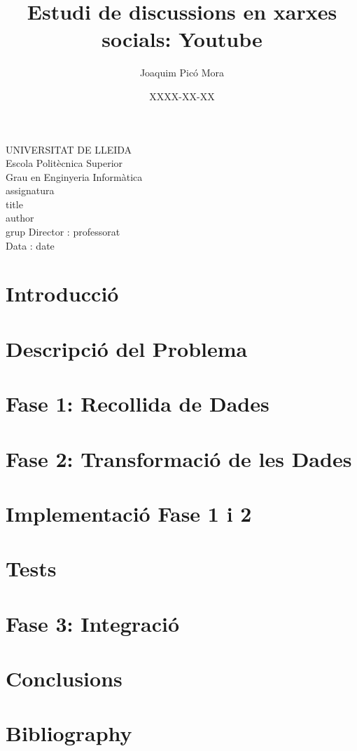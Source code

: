 \documentclass{article}
\title{Estudi de discussions en xarxes socials: Youtube}
\author{Joaquim Picó Mora}
\date{XXXX-XX-XX}
\renewcommand{\maketitle}{ %
	\begin{titlepage}
		\raggedright{UNIVERSITAT DE LLEIDA \\
			Escola Politècnica Superior \\
			Grau en Enginyeria Informàtica\\
			\1assignatura\\}
		\vspace{5cm}
		\centering\huge{\5title \\}
		\vspace{3cm}
		\large{\6author} \\
		\normalsize{\3grup}
		\vfill
		Director : \4professorat \\
		Data : \7date
\end{titlepage}}
\begin{document}
	\maketitle
	\thispagestyle{empty}
	\newpage
	\tableofcontents
	\newpage
	\section{Introducció}
	
	\newpage
	\section{Descripció del Problema}
	
	\newpage
	\section{Fase 1: Recollida de Dades}
	
	\section{Fase 2: Transformació de les Dades}
	
	\section{Implementació Fase 1 i 2}
	
	\section{Tests}
	
	\section{Fase 3: Integració}
	
	\section{Conclusions}
	
	\section{Bibliography}
	
	
\end{document}
